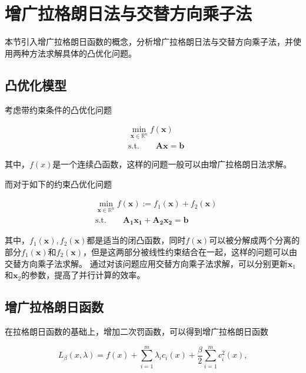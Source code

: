 \section{增广拉格朗日法与交替方向乘子法}

本节引入增广拉格朗日函数的概念，分析增广拉格朗日法\cite{1976AugLagrange}与交替方向乘子法\cite{1975ADMMBook}，并使用两种方法求解具体的凸优化问题。

\subsection{凸优化模型}

考虑带约束条件的凸优化问题

\begin{equation}\label{eq_admm_1}
    \begin{split}
        &\min\limits_{\bm{x}\in \mathbb{R}^{n}} f(\bm{x}) \\
        &\mathrm{s. t.} \quad\quad \bm{Ax} = \bm{b}
    \end{split}
\end{equation}

其中，$f(x)$是一个连续凸函数，这样的问题一般可以由增广拉格朗日法求解。

而对于如下的约束凸优化问题

\begin{equation}\label{eq_admm_2}
    \begin{split}
        &\min\limits_{\bm{x}\in \mathbb{R}^{n}} f(\bm{x}) := f_{1}(\bm{x}) + f_{2}(\bm{x}) \\
        &\mathrm{s. t.} \quad\quad \bm{A_{1}x_{1}} + \bm{A_{2}x_{2}} = \bm{b} 
    \end{split}
\end{equation}

其中，$f_{1}(\bm{x}), f_{2}(\bm{x})$都是适当的闭凸函数，同时$f(\bm{x})$可以被分解成两个分离的部分$f_{1}(\bm{x})$和$f_{2}(\bm{x})$，但是这两部分被线性约束结合在一起，这样的问题可以由交替方向乘子法求解。
通过对该问题应用交替方向乘子法求解，可以分别更新$\bm{x}_{1}$和$\bm{x}_{2}$的参数，提高了并行计算的效率。

\subsection{增广拉格朗日函数}

在拉格朗日函数的基础上，增加二次罚函数，可以得到增广拉格朗日函数

\begin{equation}\label{eq_admm_3}
    L_{\beta}(x, \lambda) = f(x) + \sum_{i=1}^{m}\lambda_{i} c_{i}(x) + \frac{\beta}{2}\sum_{i=1}^{m}c_{i}^{2}(x),
\end{equation}


